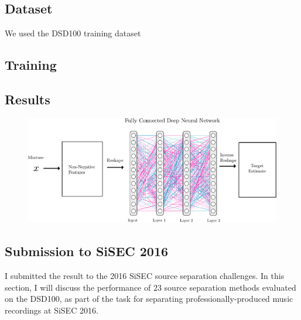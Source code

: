 \subsection{Dataset}

We used the DSD100 training dataset 
\subsection{Training}

\subsection{Results}

\begin{figure}[ht!]
\centering
		\includegraphics[width=\textwidth]{Chapters/06_Separation_Unknown/figures/uhlich_dnn.pdf}
\caption{}
\label{fig:cft_dnn}
\end{figure}

\subsection{Submission to SiSEC 2016}
\label{ssec:performance}

I submitted the result to the 2016 SiSEC source separation challenges.
In this section, I will discuss the performance of $23$ source separation methods evaluated on the DSD100, as part of the task for separating professionally-produced music recordings at SiSEC 2016.

